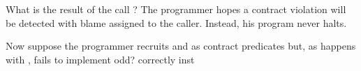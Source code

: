 What is the result of the call ?
The programmer hopes a contract violation will be detected with blame assigned to the caller.
Instead, his program never halts.

Now suppose the programmer recruits  and  as contract predicates but, as happens with , fails to implement odd? correctly inst












